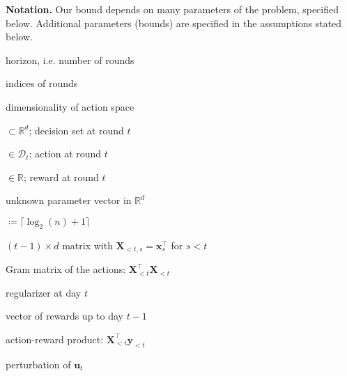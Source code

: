 \documentclass{article}
\renewcommand{\vec}[1]{\bm{#1}}
\newcommand{\defeq}{\coloneq}
\newcommand{\Real}{\mathds{R}}
\newcommand{\D}{\mathcal{D}}
\providecommand\transp{\top}
\let\transpsymbol\transp
\renewcommand{\transp}[1]{#1^\transpsymbol}
\newcommand{\XtX}[1]{\transp{#1}{#1}}
\renewcommand{\paragraph}[1]{\vspace{2pt}\noindent\textbf{#1}}
\begin{document}
\paragraph{Notation.}\label{sec:notation} Our bound depends on many
parameters of the problem, specified below. Additional parameters
(bounds) are specified in the assumptions stated below.
\begin{multicols}{2}[]
  \nolinenumbers
  \begin{description}[style=sameline,leftmargin=2em,nosep]
  \item[$n$] horizon, i.e. number of rounds
  \item[$s,t$] indices of rounds
  \item[$d$] dimensionality of action space
  \item[$\D_t$] $\subset\Real^d$; decision set at round $t$
  \item[$\vec x_t$] $\in \D_t$; action at round $t$ 
  \item[$y_t$] $\in \Real$; reward at round $t$
  \item[$\vec\theta^*$] unknown parameter vector in $\Real^d$
  \item[$m$] $\defeq \lceil\log_2(n)+1 \rceil$
  \item[$\vec X_{<t}$] $(t-1)\times d$ matrix with $\vec X_{<t,s} = \transp{\vec
      x_s}$ for $s<t$
  \item[$\vec G_t$] Gram matrix of the actions: $\XtX{\vec X_{<t}}$
  \item[$\vec H_t$] regularizer at day $t$
  \item[$\vec y_{<t}$] vector of rewards up to day $t-1$
  \item[$\vec u_t$] action-reward product: $\transp{\vec X_{<t}} \vec y_{<t}$
  \item[$\vec h_t$] perturbation of $\vec u_t$
  \end{description}
  \linenumbers
\end{multicols}
\end{document}
